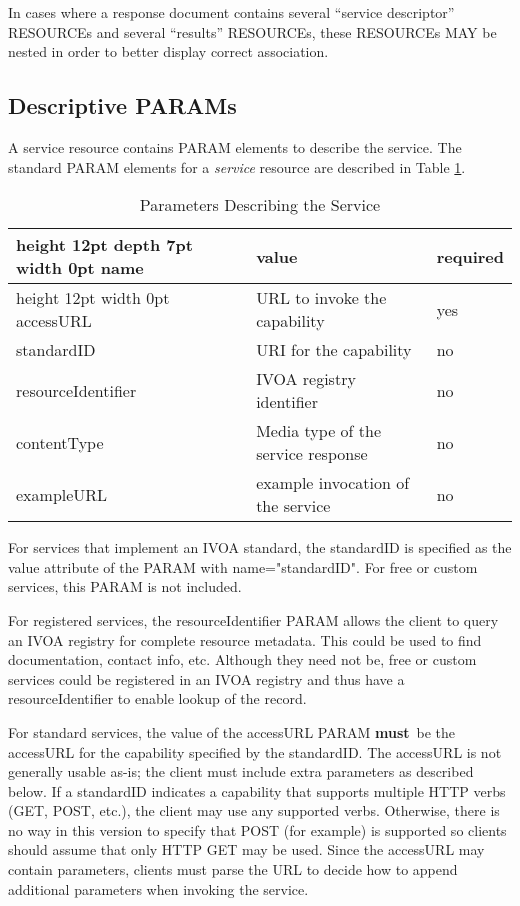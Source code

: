 \documentclass[11pt,a4paper]{ivoa}
\newcommand{\attval}[2]{#1={\allowbreak}{"}#2{"}}
\newcommand{\rfcmust}{\textbf{must}}
\begin{document}
In cases where a response document contains several ``service descriptor'' RESOURCEs
and several ``results'' RESOURCEs, these RESOURCEs MAY be nested in
order to better display correct association.

\subsection{Descriptive PARAMs}
\label{sec:descParams}

A service resource contains PARAM elements to describe the service.
The standard PARAM elements for a {\em service\/} resource
are described in Table \ref{tab:serviceParams}.

\begin{table}[h]
\begin{center}
\begin{tabular}{|l|l|l|}
\hline
\vrule height 12pt depth 7pt width 0pt {\bf name}          &  {\bf value}                          & {\bf required}  \\
\hline
\vrule height 12pt width 0pt accessURL           & URL to invoke the capability          &  yes  \\
standardID          & URI for the capability                &  no   \\
resourceIdentifier  & IVOA registry identifier              &  no   \\
contentType	        & Media type of the service response    & no \\
exampleURL          & example invocation of the service     & no \\
\hline
\end{tabular}
\end{center}
\caption{Parameters Describing the Service}
\label{tab:serviceParams}
\end{table}

For services that implement an IVOA standard, the standardID is specified
as the value attribute of the PARAM with \attval{name}{standardID}.
For free or custom services, this PARAM is not included.

For registered services, the resourceIdentifier PARAM allows the client
to query an IVOA registry for complete resource metadata. This could be
used to find documentation, contact info, etc. Although they need not be,
free or custom services could be registered in an IVOA registry and thus
have a resourceIdentifier to enable lookup of the record.

For standard services, the value of the accessURL PARAM \rfcmust\ be the
accessURL for the capability specified by the standardID. The accessURL
is not generally usable as-is; the client must include extra parameters
as described below. If a standardID indicates a capability that supports
multiple HTTP verbs (GET, POST, etc.), the client may use any supported
verbs. Otherwise, there is no way in this version to specify that POST
(for example) is supported so clients should assume that only HTTP GET
may be used. Since the accessURL may contain parameters, clients must
parse the URL to decide how to append additional parameters when
invoking the service.
\end{document}
